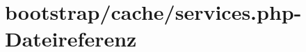 \hypertarget{services_8php}{}\section{bootstrap/cache/services.php-\/\+Dateireferenz}
\label{services_8php}
